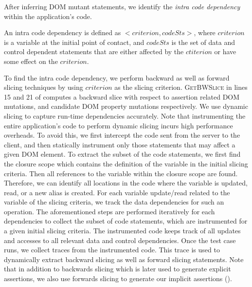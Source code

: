 After inferring DOM mutant statements, we identify the \emph{intra code dependency} within the application's code.
\begin{mydef}
\label{def:intraCodeDep}  
An intra code dependency is defined as $<criterion, codeSts>$, where $criterion$ is a variable at the initial point of contact, and $codeSts$ is the set of data and control dependent statements that are either affected by the $ctiterion$ or have some effect on the $criterion$. 
\end{mydef}
To find the intra code dependency, we perform backward as well as forward slicing techniques by using $criterion$ as the slicing criterion.
\textsc{GetBWSlice} in lines  15 and 21 of  computes a backward slice with respect to assertion related DOM mutations, and candidate DOM property mutations respectively.
We use dynamic slicing to capture run-time dependencies accurately.
Note that instrumenting the entire application's code to perform dynamic slicing incurs high performance overheads. To avoid this, we first intercept the code sent from the server to the client, and then statically instrument only those statements that may affect a given DOM element.
To extract the subset of the code statements, we first find the \javascript closure scope which contains the definition of the variable in the initial slicing criteria. Then all references to the variable within the closure scope are found. Therefore, we can identify all locations in the code where the variable is updated, read, or a new alias is created. For each variable update/read related to the variable of the slicing criteria, we track the data dependencies for such an operation. The aforementioned steps are performed iteratively for each dependencies to collect the subset of code statements, which are instrumented for a given initial slicing criteria.
The instrumented code keeps track of all updates and accesses to all relevant data and control dependencies.   
Once the test case runs, we collect traces from the instrumented code. This trace is used to dynamically extract backward slicing as well as forward slicing statements. Note that in addition to backwards slicing which is later used to generate explicit assertions, we also use forwards slicing to generate our implicit assertions ().  

